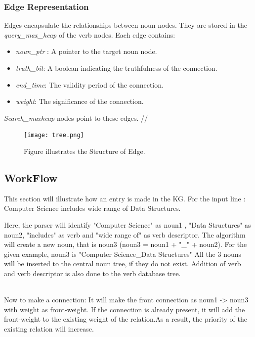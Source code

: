 \documentclass[conference]{IEEEtran}
\begin{document}
\subsubsection{Edge Representation}
Edges encapsulate the relationships between noun nodes. They are stored in the \textit{query\_max\_heap} of the verb nodes. Each edge contains:
\begin{itemize}

    \item \textit{noun\_ptr} : A pointer to the target noun node.
    \item \textit{truth\_bit}: A boolean indicating the truthfulness of the connection.
    \item \textit{end\_time}: The validity period of the connection.
    \item \textit{weight}: The significance of the connection.
\end{itemize}

\textit{Search\_maxheap} nodes point to these edges.
//




\begin{figure}[htbp]
\centerline{\texttt{[image: tree.png]}}
\caption{Figure illustrates the Structure of Edge.}
\label{fig}
\end{figure}



\subsection*{WorkFlow}

This section will illustrate how an entry is made in the KG. 
For the input line : Computer Science includes wide range of Data Structures.

Here, the parser will identify "Computer Science" as noun1 , "Data Structures" as noun2, "includes" as verb and "wide range of" as verb descriptor.
The algorithm will create a new noun, that is noun3 (noun3 = noun1 + "\_" + noun2). For the given example, noun3 is "Computer Science\_Data Structures" 
All the 3 nouns will be inserted to the central noun tree, if they do not exist.
Addition of verb and verb descriptor is also done to the verb database tree.

\\
Now to make a connection:
It will make the front connection as noun1 -> noun3 with weight as front-weight. If the connection is already present, it will add the front-weight to the existing weight of the relation.As a result, the priority of the existing relation will increase.
\end{document}
